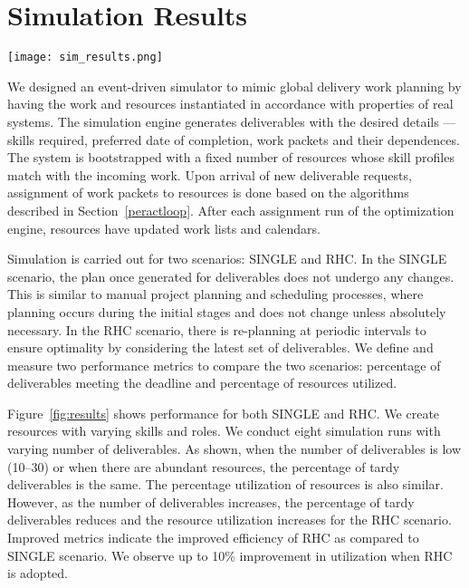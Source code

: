 \documentclass[10pt,journal,cspaper,compsoc]{IEEEtran}
\begin{document}
\section{Simulation Results}
\label{sec:simul}
\begin{figure*}
  \centering
  \texttt{[image: sim\_results.png]}
  \caption{Comparing the performance of RHC coordination with typical human-oriented coordination.}
  \label{fig:results}
\end{figure*}
We designed an event-driven simulator to mimic global delivery work planning by having 
the work and resources instantiated in accordance with properties of real systems. The 
simulation engine generates deliverables with the desired details --– skills required, preferred 
date of completion, work packets and their dependences. The system is bootstrapped with a 
fixed number of resources whose skill profiles match with the incoming work. Upon arrival of 
new deliverable requests, assignment of work packets to resources is done based on the algorithms
described in Section~\ref{peractloop}.  After each assignment run of the optimization engine, 
resources have updated work lists and calendars.  

Simulation is carried out for two scenarios: 
SINGLE and RHC. In the SINGLE scenario, the plan once generated for deliverables does not 
undergo any changes. This is similar to manual project planning and scheduling processes, 
where planning occurs during the initial stages and does not change unless absolutely 
necessary. In the RHC scenario, there is re-planning 
at periodic intervals to ensure optimality by considering the latest set of deliverables. 
We define and measure two performance metrics to compare the two scenarios: percentage of deliverables 
meeting the deadline and percentage of resources utilized. 

Figure~\ref{fig:results} shows performance for both SINGLE and RHC. We create  
resources with varying skills and roles. We conduct eight simulation runs with varying number of deliverables. 
As shown, when the number of deliverables is low (10--30) or when there are 
abundant resources, the percentage of tardy deliverables is the same. The percentage utilization
of resources is also similar. However, as the number of deliverables increases, the percentage 
of tardy deliverables reduces and the resource utilization increases for the RHC scenario. 
Improved metrics indicate the improved efficiency of RHC as compared to SINGLE scenario. 
We observe up to 10\% improvement in utilization when RHC is adopted. 
\end{document}
